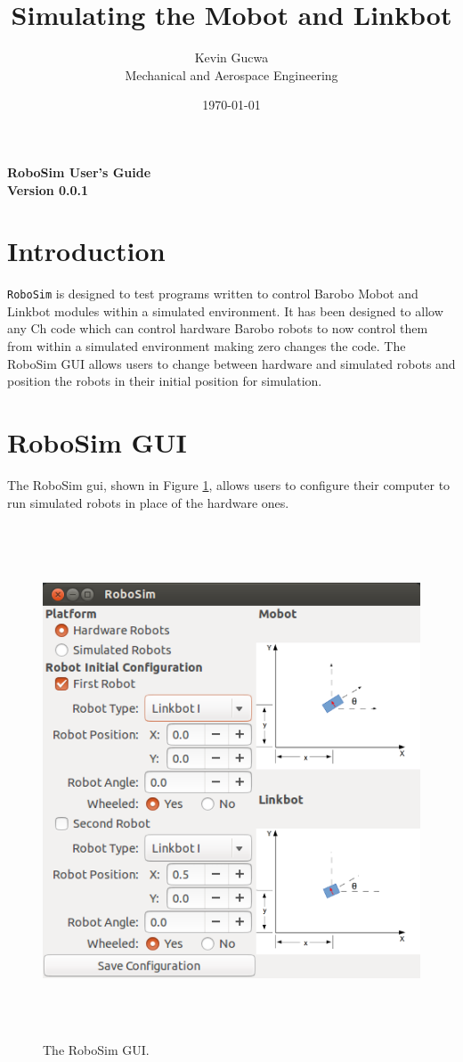 \documentclass{article}
\title{Simulating the Mobot and Linkbot}
\author{Kevin Gucwa\\Mechanical and Aerospace Engineering}
\date{\today}
\begin{document}
\begin{center}
{\Huge\sf\bf RoboSim User's Guide}\\
\vspace*{2.5cm}
{\Large\bf Version 0.0.1}
\vspace{4.5cm}
\end{center}

\newpage
\tableofcontents
\newpage

\section{Introduction}
\texttt{RoboSim} is designed to test programs written to control Barobo Mobot
and Linkbot modules within a simulated environment.  It has been designed to allow
any Ch code which can control hardware Barobo robots to now control them from
within a simulated environment making zero changes the code.  The RoboSim GUI allows
users to change between hardware and simulated robots and position the robots
in their initial position for simulation.

\section{RoboSim GUI}
\label{sec:gui}
The RoboSim gui, shown in Figure \ref{fig:gui}, allows users to configure their computer to run simulated robots
in place of the hardware ones.

\begin{figure}[H]
	\begin{center}
		\includegraphics[height=6in]{images/gui}
	\end{center}
	\caption{The RoboSim GUI.}
	\label{fig:gui}
\end{figure}
\end{document}
